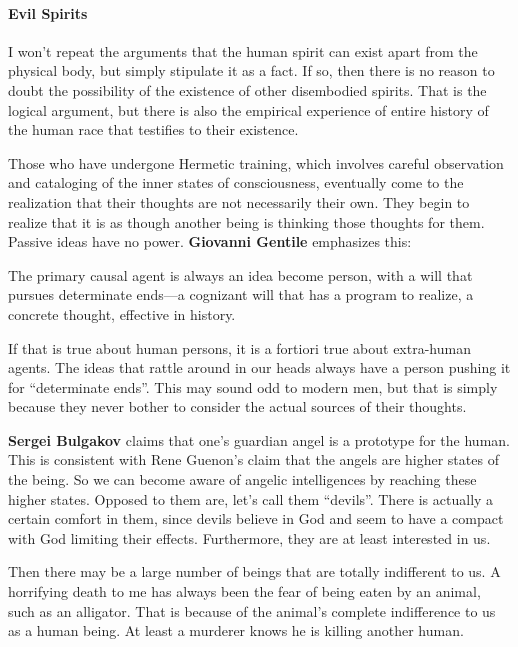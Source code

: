 \paragraph{Evil Spirits}


I won't repeat the arguments that the human spirit can exist apart from the physical body, but simply stipulate it as a fact. If so, then there is no reason to doubt the possibility of the existence of other disembodied spirits. That is the logical argument, but there is also the empirical experience of entire history of the human race that testifies to their existence.

Those who have undergone Hermetic training, which involves careful observation and cataloging of the inner states of consciousness, eventually come to the realization that their thoughts are not necessarily their own. They begin to realize that it is as though another being is thinking those thoughts for them. Passive ideas have no power. \textbf{Giovanni Gentile} emphasizes this:

\begin{quotex}
The primary causal agent is always an idea become person, with a will that pursues determinate ends---a cognizant will that has a program to realize, a concrete thought, effective in history.
\end{quotex}


If that is true about human persons, it is a fortiori true about extra-human agents. The ideas that rattle around in our heads always have a person pushing it for ``determinate ends''. This may sound odd to modern men, but that is simply because they never bother to consider the actual sources of their thoughts.

\textbf{Sergei Bulgakov} claims that one's guardian angel is a prototype for the human. This is consistent with Rene Guenon's claim that the angels are higher states of the being. So we can become aware of angelic intelligences by reaching these higher states. Opposed to them are, let's call them ``devils''. There is actually a certain comfort in them, since devils believe in God and seem to have a compact with God limiting their effects. Furthermore, they are at least interested in us.

Then there may be a large number of beings that are totally indifferent to us. A horrifying death to me has always been the fear of being eaten by an animal, such as an alligator. That is because of the animal's complete indifference to us as a human being. At least a murderer knows he is killing another human.

